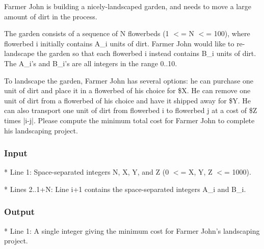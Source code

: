 

Farmer John is building a nicely-landscaped garden, and needs to move a large amount of dirt in the process.

The garden consists of a sequence of N flowerbeds (1 $<$= N $<$= 100), where flowerbed i initially contains A\_i units of dirt.  Farmer John would like to re-landscape the garden so that each flowerbed i instead contains B\_i units of dirt.  The A\_i's and B\_i's are all integers in the range 0..10.

To landscape the garden, Farmer John has several options: he can purchase one unit of dirt and place it in a flowerbed of his choice for \$X.  He can remove one unit of dirt from a flowerbed of his choice and have it shipped away for \$Y.  He can also transport one unit of dirt from flowerbed i to flowerbed j at a cost of \$Z times |i-j|.  Please compute the minimum total cost for Farmer John to complete his landscaping project.

\subsubsection{Input}

* Line 1: Space-separated integers N, X, Y, and Z (0 $<$= X, Y, Z $<$=         1000).

* Lines 2..1+N: Line i+1 contains the space-separated integers A\_i and         B\_i.

\subsubsection{Output}

* Line 1: A single integer giving the minimum cost for Farmer John's         landscaping project.

